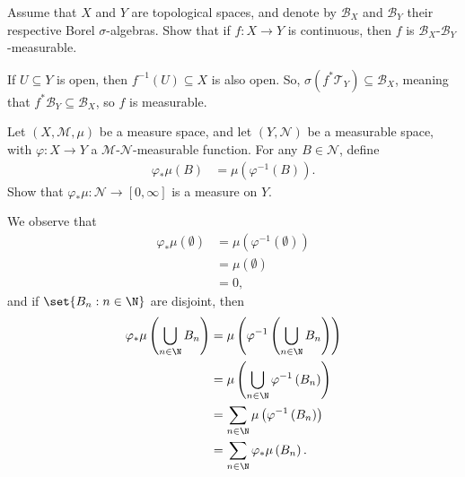 \documentclass[10pt]{mypackage}
\begin{document}
\begin{problem}
  Assume that $X$ and $Y$ are topological spaces, and denote by $\mathcal{B}_X$ and $\mathcal{B}_Y$ their respective Borel $\sigma$-algebras. Show that if $f\colon X\to Y$ is continuous, then $f$ is $\mathcal{B}_X$-$\mathcal{B}_Y$-measurable.
\end{problem}
\begin{solution}
  If $U\subseteq Y$ is open, then $f^{-1}\left( U \right)\subseteq X$ is also open. So, $\sigma\left( f^{\ast}\mathcal{T}_Y \right)\subseteq \mathcal{B}_X$, meaning that $f^{\ast}\mathcal{B}_Y\subseteq \mathcal{B}_X$, so $f$ is measurable.
\end{solution}
\begin{problem}
  Let $\left( X,\mathcal{M},\mu \right)$ be a measure space, and let $\left( Y,\mathcal{N} \right)$ be a measurable space, with $\varphi\colon X\to Y$ a $\mathcal{M}$-$\mathcal{N}$-measurable function. For any $B\in \mathcal{N}$, define
  \begin{align*}
    \varphi_{\ast}\mu\left( B \right) &= \mu\left( \varphi^{-1}\left( B \right) \right).
  \end{align*}
  Show that $\varphi_{\ast}\mu\colon \mathcal{N}\to [0,\infty]$ is a measure on $Y$.
\end{problem}
\begin{solution}
  We observe that
  \begin{align*}
    \varphi_{\ast}\mu\left( \emptyset \right) &= \mu\left( \varphi^{-1}\left( \emptyset \right) \right)\\
                                              &= \mu\left( \emptyset \right)\\
                                              &= 0,
  \end{align*}
  and if $\set{B_n : n\in \N}$ are disjoint, then
  \begin{align*}
    \varphi_{\ast}\mu\left( \bigcup_{n\in \N}B_n \right) &= \mu\left( \varphi^{-1}\left( \bigcup_{n\in \N}B_n \right) \right)\\
                                                         &= \mu\left( \bigcup_{n\in \N}\varphi^{-1}\left( B_n \right) \right)\\
                                                         &= \sum_{n\in \N}\mu\left( \varphi^{-1}\left( B_n \right) \right)\\
                                                         &= \sum_{n\in \N}\varphi_{\ast}\mu\left( B_n \right).
  \end{align*}
\end{solution}
\end{document}
